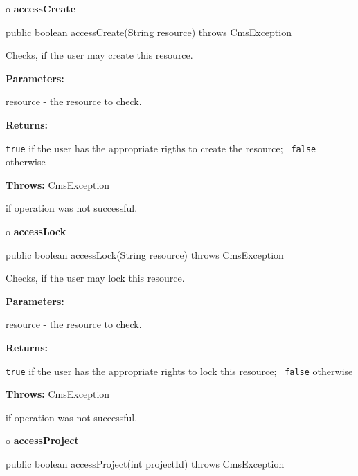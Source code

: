 o {\bf accessCreate} 

\begin{PRE}
 public boolean accessCreate(String resource) throws CmsException
\end{PRE}

\begin{description}
\htmlDD Checks, if the user may create this resource. 

\begin{description}
\item {\bf Parameters:}  

resource - the resource to check.  
\item {\bf Returns:}  

{\tt true} if the user has the appropriate rigths to create the resource; {\tt
false} otherwise  
\item {\bf Throws:} CmsException  

if operation was not successful.  
\end{description}

\end{description}

o {\bf accessLock} 

\begin{PRE}
 public boolean accessLock(String resource) throws CmsException
\end{PRE}

\begin{description}
\htmlDD Checks, if the user may lock this resource. 

\begin{description}
\item {\bf Parameters:}  

resource - the resource to check.  
\item {\bf Returns:}  

{\tt true} if the user has the appropriate rights to lock this resource; {\tt
false} otherwise  
\item {\bf Throws:} CmsException  

if operation was not successful.  
\end{description}

\end{description}

o {\bf accessProject} 

\begin{PRE}
 public boolean accessProject(int projectId) throws CmsException
\end{PRE}

